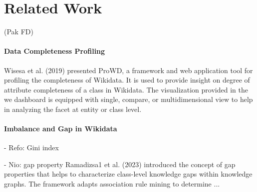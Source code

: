 \section{Related Work} (Pak FD)

\paragraph{Data Completeness Profiling} Wisesa et al. (2019) presented ProWD, a framework and web application tool for profiling the completeness of Wikidata. It is used to provide insight on degree of attribute completeness of a class in Wikidata. The visualization provided in the we dashboard is equipped with single, compare, or multidimensional view to help in analyzing the facet at entity or class level.

\paragraph{Imbalance and Gap in Wikidata}
- Refo: Gini index

- Nio: gap property
Ramadizsa1 et al. (2023) introduced the concept of gap properties that helps to characterize class-level knowledge gaps within knowledge graphs. The framework adapts association rule mining to determine ...